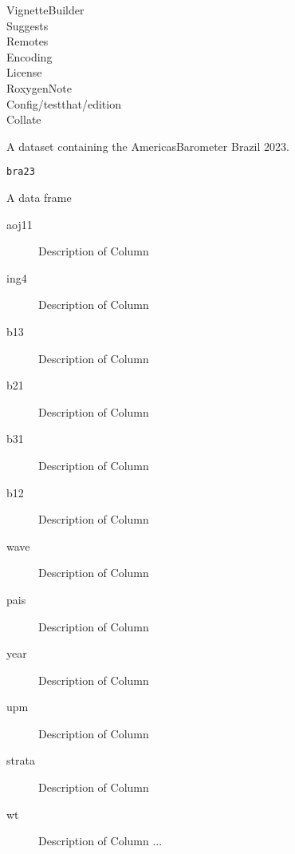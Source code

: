 \documentclass[a4paper]{book}
\begin{document}
\begin{description}
\item[VignetteBuilder]
\item[Suggests]
\item[Remotes]
\item[Encoding]
\item[License]
\item[RoxygenNote]
\item[Config/testthat/edition]
\item[Collate]
\end{description}
%
\begin{Description}
A dataset containing the AmericasBarometer Brazil 2023.
\end{Description}
%
\begin{Usage}
\begin{verbatim}
bra23
\end{verbatim}
\end{Usage}
%
\begin{Format}
A data frame
\begin{description}

\item[aoj11] Description of Column
\item[ing4] Description of Column
\item[b13] Description of Column
\item[b21] Description of Column
\item[b31] Description of Column
\item[b12] Description of Column
\item[wave] Description of Column
\item[pais] Description of Column
\item[year] Description of Column
\item[upm] Description of Column
\item[strata] Description of Column
\item[wt] Description of Column
...

\end{description}

\end{Format}
\end{document}

